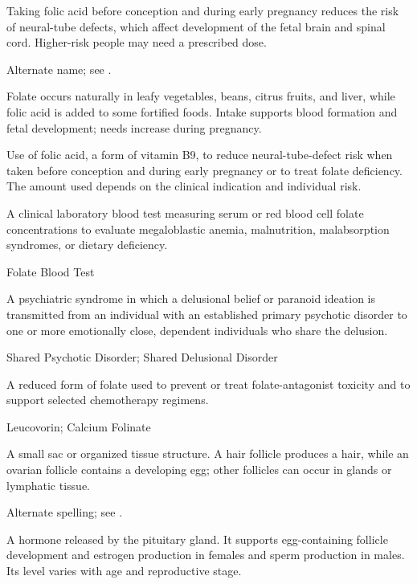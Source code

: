  Taking folic acid before conception and during early pregnancy reduces the risk of neural-tube defects, which affect development of the fetal brain and spinal cord. Higher-risk people may need a prescribed dose.

 Alternate name; see .

 Folate occurs naturally in leafy vegetables, beans, citrus fruits, and liver, while folic acid is added to some fortified foods. Intake supports blood formation and fetal development; needs increase during pregnancy.

 Use of folic acid, a form of vitamin B9, to reduce neural-tube-defect risk when taken before conception and during early pregnancy or to treat folate deficiency. The amount used depends on the clinical indication and individual risk.

 A clinical laboratory blood test measuring serum or red blood cell folate concentrations to evaluate megaloblastic anemia, malnutrition, malabsorption syndromes, or dietary deficiency.

\synonyms
Folate Blood Test

 A psychiatric syndrome in which a delusional belief or paranoid ideation is transmitted from an individual with an established primary psychotic disorder to one or more emotionally close, dependent individuals who share the delusion.

\synonyms
Shared Psychotic Disorder; Shared Delusional Disorder

 A reduced form of folate used to prevent or treat folate-antagonist toxicity and to support selected chemotherapy regimens.

\synonyms
Leucovorin; Calcium Folinate

 A small sac or organized tissue structure. A hair follicle produces a hair, while an ovarian follicle contains a developing egg; other follicles can occur in glands or lymphatic tissue.

 Alternate spelling; see .

 A hormone released by the pituitary gland. It supports egg-containing follicle development and estrogen production in females and sperm production in males. Its level varies with age and reproductive stage.

